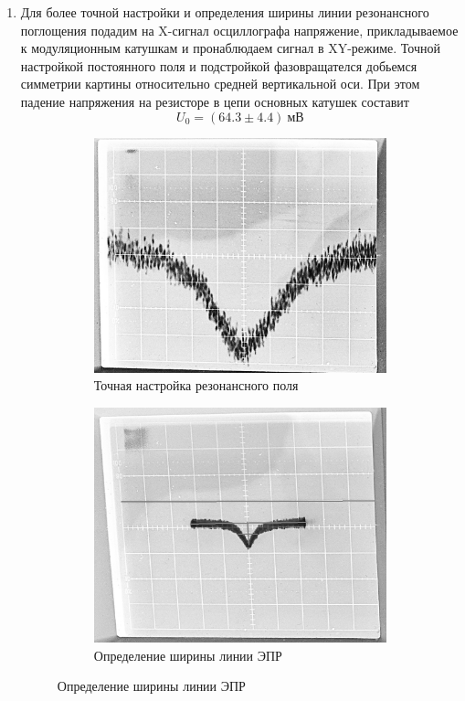 \documentclass[14pt, a4paper]{report}
\begin{document}
\begin{enumerate}

\item Для более точной настройки и определения ширины линии резонансного поглощения подадим на X-сигнал осциллографа напряжение, прикладываемое к модуляционным катушкам и пронаблюдаем сигнал в XY-режиме. Точной настройкой постоянного поля и подстройкой фазовращателся добьемся симметрии картины относительно средней вертикальной оси. При этом падение напряжения на резисторе в цепи основных катушек составит
\[U_0=(64.3\pm4.4)\ мВ\]

\begin{figure}[H]
\centering
\begin{subfigure}{.5\textwidth}
  \centering
  \includegraphics[width=.9\linewidth]{../images/5101-5}
  \caption{Точная настройка резонансного поля}
\end{subfigure}%
\begin{subfigure}{.5\textwidth}
  \centering
  \includegraphics[width=.9\linewidth]{../images/5101-6}
  \caption{Определение ширины линии ЭПР}
\end{subfigure}
\end{figure}


\end{enumerate}
\end{document}
